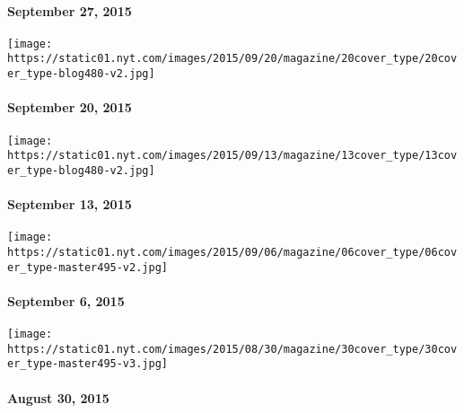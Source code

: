 \hypertarget{september-27-2015}{%
\paragraph{September 27, 2015}\label{september-27-2015}}

\href{http://www.nytimes.com/indexes/2015/09/20/magazine/index.html}{}

\texttt{[image: https://static01.nyt.com/images/2015/09/20/magazine/20cover\_type/20cover\_type-blog480-v2.jpg]}

\hypertarget{september-20-2015}{%
\paragraph{September 20, 2015}\label{september-20-2015}}

\href{http://www.nytimes.com/indexes/2015/09/13/magazine/index.html}{}

\texttt{[image: https://static01.nyt.com/images/2015/09/13/magazine/13cover\_type/13cover\_type-blog480-v2.jpg]}

\hypertarget{september-13-2015}{%
\paragraph{September 13, 2015}\label{september-13-2015}}

\href{http://www.nytimes.com/indexes/2015/09/06/magazine/index.html}{}

\texttt{[image: https://static01.nyt.com/images/2015/09/06/magazine/06cover\_type/06cover\_type-master495-v2.jpg]}

\hypertarget{september-6-2015}{%
\paragraph{September 6, 2015}\label{september-6-2015}}

\href{http://www.nytimes.com/indexes/2015/08/30/magazine/index.html}{}

\texttt{[image: https://static01.nyt.com/images/2015/08/30/magazine/30cover\_type/30cover\_type-master495-v3.jpg]}

\hypertarget{august-30-2015}{%
\paragraph{August 30, 2015}\label{august-30-2015}}

\href{http://www.nytimes.com/indexes/2015/08/23/magazine/index.html}{}

